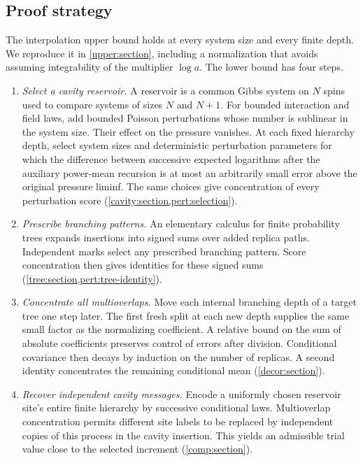 \subsection{Proof strategy}

The interpolation upper bound holds at every system size and every
finite depth. We reproduce it in \cref{upper:section}, including a
normalization that avoids assuming integrability of the multiplier
$\log a$. The lower bound has four steps.

\begin{enumerate}[label=\textup{\arabic*.},leftmargin=*]
\item \emph{Select a cavity reservoir.}
A reservoir is a common Gibbs system on $N$ spins used to compare
systems of sizes $N$ and $N+1$.
For bounded interaction and field laws, add bounded Poisson perturbations whose
number is sublinear in the system size. Their effect on the pressure
vanishes. At each fixed hierarchy depth, select system sizes and
deterministic perturbation parameters for which the difference between
successive expected logarithms after the auxiliary power-mean recursion
is at most an arbitrarily small error above the original pressure liminf. The same choices give concentration of every
perturbation score (\cref{cavity:section,pert:selection}).

\item \emph{Prescribe branching patterns.}
An elementary calculus for finite probability trees expands insertions
into signed sums over added replica paths. Independent marks select any
prescribed branching pattern. Score concentration then gives identities
for these signed sums (\cref{tree:section,pert:tree-identity}).

\item \emph{Concentrate all multioverlaps.}
Move each internal branching depth of a target tree one step later.
The first fresh split at each new depth supplies the same small factor
as the normalizing coefficient. A relative bound on the sum of absolute
coefficients preserves control of errors after division. Conditional
covariance then decays by induction on the number of replicas.
A second identity concentrates the remaining conditional mean
(\cref{decor:section}).

\item \emph{Recover independent cavity messages.}
Encode a uniformly chosen reservoir site's entire finite hierarchy by
successive conditional laws. Multioverlap concentration permits different
site labels to be replaced by independent copies of this process in
the cavity insertion. This yields an admissible trial value close to
the selected increment (\cref{comp:section}).
\end{enumerate}

